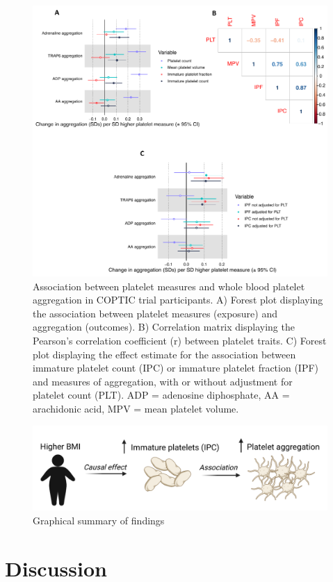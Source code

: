 \documentclass[11pt,twoside]{bristolthesis}
\begin{document}
\begin{figure}
\includegraphics[width=0.85\linewidth]{figure/BMI_platelets/IPC_aggregation} \caption[Association between platelet measures and whole blood platelet aggregation in COPTIC trial participants]{Association between platelet measures and whole blood platelet aggregation in COPTIC trial participants. A) Forest plot displaying the association between platelet measures (exposure) and aggregation (outcomes). B) Correlation matrix displaying the Pearson’s correlation coefficient (r) between platelet traits. C) Forest plot displaying the effect estimate for the association between immature platelet count (IPC) or immature platelet fraction (IPF) and measures of aggregation, with or without adjustment for platelet count (PLT). ADP = adenosine diphosphate, AA = arachidonic acid, MPV = mean platelet volume.}\label{fig:IPC-aggregation}
\end{figure}
\begin{figure}
\includegraphics[width=0.9\linewidth]{figure/BMI_platelets/Visual_abstract} \caption{Graphical summary of findings}\label{fig:BMI-platelet-cartoon}
\end{figure}
\hypertarget{discussion}{%
\section{Discussion}\label{discussion}}
\end{document}
